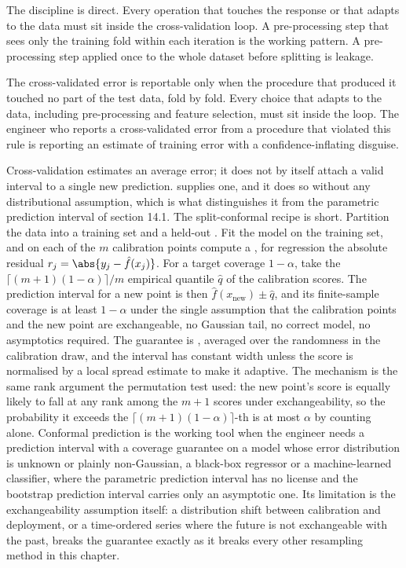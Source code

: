 The discipline is direct. Every operation that touches the response
or that adapts to the data must sit inside the cross-validation
loop. A pre-processing step that sees only the training fold within
each iteration is the working pattern. A pre-processing step
applied once to the whole dataset before splitting is leakage.

\begin{principle}
The cross-validated error is reportable only when the procedure
that produced it touched no part of the test data, fold by fold.
Every choice that adapts to the data, including pre-processing and
feature selection, must sit inside the loop. The engineer who
reports a cross-validated error from a procedure that violated
this rule is reporting an estimate of training error with a
confidence-inflating disguise.
\end{principle}

\begin{mastery}
Cross-validation estimates an average error; it does not by itself
attach a valid interval to a single new prediction.  supplies one, and it does so without any distributional
assumption, which is what distinguishes it from the parametric
prediction interval of section 14.1. The split-conformal recipe is
short. Partition the data into a training set and a held-out
. Fit the model on the training set, and on
each of the $m$ calibration points compute a , for regression the absolute residual $r_{j} = \abs{y_{j} -
\hat{f}(x_{j})}$. For a target coverage $1 - \alpha$, take the
$\lceil (m+1)(1-\alpha) \rceil / m$ empirical quantile $\hat{q}$ of the
calibration scores. The prediction interval for a new point is then
$\hat{f}(x_{\mathrm{new}}) \pm \hat{q}$, and its finite-sample coverage
is at least $1 - \alpha$ under the single assumption that the
calibration points and the new point are exchangeable, no Gaussian
tail, no correct model, no asymptotics required. The guarantee is
, averaged over the randomness in the calibration
draw, and the interval has constant width unless the score is
normalised by a local spread estimate to make it adaptive. The
mechanism is the same rank argument the permutation test used: the new
point's score is equally likely to fall at any rank among the $m + 1$
scores under exchangeability, so the probability it exceeds the
$\lceil (m+1)(1-\alpha)\rceil$-th is at most $\alpha$ by counting
alone. Conformal prediction is the working tool when the engineer needs
a prediction interval with a coverage guarantee on a model whose error
distribution is unknown or plainly non-Gaussian, a black-box regressor
or a machine-learned classifier, where the parametric prediction
interval has no license and the bootstrap prediction interval carries
only an asymptotic one. Its limitation is the exchangeability
assumption itself: a distribution shift between calibration and
deployment, or a time-ordered series where the future is not
exchangeable with the past, breaks the guarantee exactly as it breaks
every other resampling method in this chapter.
\end{mastery}

